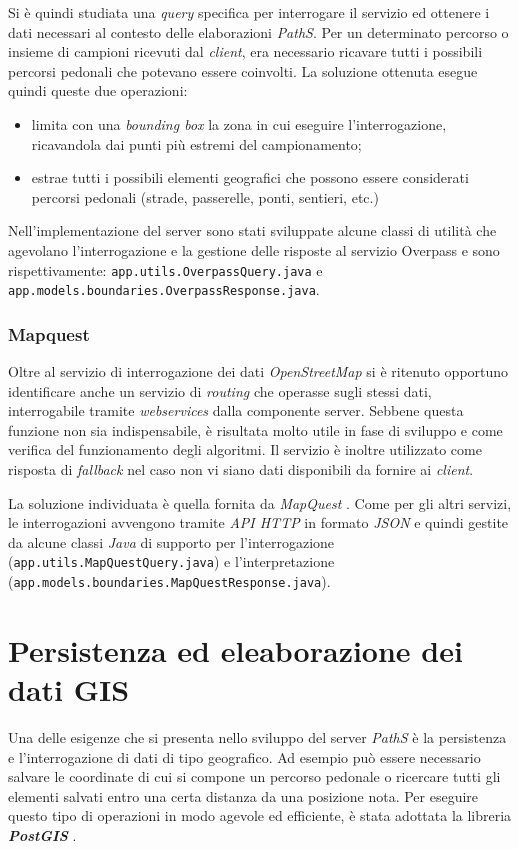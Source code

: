Si è quindi studiata una \emph{query} specifica per interrogare il servizio ed ottenere i dati necessari al contesto delle elaborazioni \emph{PathS}. Per un determinato percorso o insieme di campioni ricevuti dal \emph{client}, era necessario ricavare tutti i possibili percorsi pedonali che potevano essere coinvolti. La soluzione ottenuta esegue quindi queste due operazioni:
\begin{itemize}
\item limita con una \emph{bounding box} la zona in cui eseguire l'interrogazione, ricavandola dai punti più estremi del campionamento;
\item estrae tutti i possibili elementi geografici che possono essere considerati percorsi pedonali (strade, passerelle, ponti, sentieri, etc.)
\end{itemize}
Nell'implementazione del server sono stati sviluppate alcune classi di utilità che agevolano l'interrogazione e la gestione delle risposte al servizio Overpass e sono rispettivamente: \texttt{app.\-utils.\-OverpassQuery.java} e \texttt{app.\-models.\-boundaries.\-OverpassResponse.java}.

\subsubsection{Mapquest}
Oltre al servizio di interrogazione dei dati \emph{OpenStreetMap} si è ritenuto opportuno identificare anche un servizio di \emph{routing} che operasse sugli stessi dati, interrogabile tramite \emph{webservices} dalla componente server. Sebbene questa funzione non sia indispensabile, è risultata molto utile in fase di sviluppo e come verifica del funzionamento degli algoritmi. Il servizio è inoltre utilizzato come risposta di \emph{fallback} nel caso non vi siano dati disponibili da fornire ai \emph{client}.

La soluzione individuata è quella fornita da \emph{MapQuest} \cite{mapquest}. Come per gli altri servizi, le interrogazioni avvengono tramite \emph{API HTTP} in formato \emph{JSON} e quindi gestite da alcune classi \emph{Java} di supporto per l'interrogazione (\texttt{app.\-utils.\-MapQuestQuery.java}) e l'interpretazione (\texttt{app.\-models.\-boundaries.\-MapQuestResponse.java}).


\section{Persistenza ed eleaborazione dei dati GIS}
Una delle esigenze che si presenta nello sviluppo del server \emph{PathS} è la persistenza e l'interrogazione di dati di tipo geografico. Ad esempio può essere necessario salvare le coordinate di cui si compone un percorso pedonale o ricercare tutti gli elementi salvati entro una certa distanza da una posizione nota. Per eseguire questo tipo di operazioni in modo agevole ed efficiente, è stata adottata la libreria \textbf{\emph{PostGIS}} \cite{postgis}.

